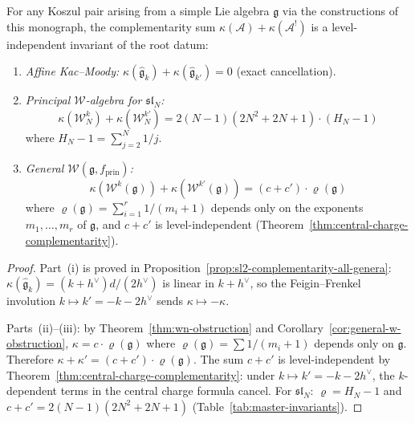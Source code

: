\begin{theorem}
\label{thm:complementarity-root-datum}
For any Koszul pair arising from a simple Lie algebra $\mathfrak{g}$ via the constructions of this monograph, the complementarity sum $\kappa(\mathcal{A}) + \kappa(\mathcal{A}^!)$ is a level-independent invariant of the root datum:
\begin{enumerate}[label=\textup{(\roman*)}]
\item \emph{Affine Kac--Moody:} $\kappa(\widehat{\mathfrak{g}}_k) + \kappa(\widehat{\mathfrak{g}}_{k'}) = 0$ \textup{(}exact cancellation\textup{)}.
\item \emph{Principal $\mathcal{W}$-algebra for $\mathfrak{sl}_N$:}
\begin{equation}\label{eq:wn-kappa-sum-general}
\kappa(\mathcal{W}_N^k) + \kappa(\mathcal{W}_N^{k'}) = 2(N{-}1)(2N^2{+}2N{+}1) \cdot (H_N - 1)
\end{equation}
where $H_N - 1 = \sum_{j=2}^N 1/j$.
\item \emph{General $\mathcal{W}(\mathfrak{g}, f_{\mathrm{prin}})$:}
\begin{equation}\label{eq:general-w-kappa-sum}
\kappa(\mathcal{W}^k(\mathfrak{g})) + \kappa(\mathcal{W}^{k'}(\mathfrak{g})) = (c + c') \cdot \varrho(\mathfrak{g})
\end{equation}
where $\varrho(\mathfrak{g}) = \sum_{i=1}^r 1/(m_i + 1)$ depends only on the exponents $m_1, \ldots, m_r$ of $\mathfrak{g}$, and $c + c'$ is level-independent \textup{(}Theorem~\textup{\ref{thm:central-charge-complementarity})}.
\end{enumerate}
\end{theorem}

\begin{proof}
Part~(i) is proved in Proposition~\ref{prop:sl2-complementarity-all-genera}: $\kappa(\widehat{\mathfrak{g}}_k) = (k+h^\vee) d / (2h^\vee)$ is linear in $k+h^\vee$, so the Feigin--Frenkel involution $k \mapsto k' = -k-2h^\vee$ sends $\kappa \mapsto -\kappa$.

Parts~(ii)--(iii): by Theorem~\ref{thm:wn-obstruction} and Corollary~\ref{cor:general-w-obstruction}, $\kappa = c \cdot \varrho(\mathfrak{g})$ where $\varrho(\mathfrak{g}) = \sum 1/(m_i+1)$ depends only on $\mathfrak{g}$. Therefore $\kappa + \kappa' = (c+c') \cdot \varrho(\mathfrak{g})$. The sum $c + c'$ is level-independent by Theorem~\ref{thm:central-charge-complementarity}: under $k \mapsto k' = -k-2h^\vee$, the $k$-dependent terms in the central charge formula cancel. For $\mathfrak{sl}_N$: $\varrho = H_N - 1$ and $c+c' = 2(N-1)(2N^2+2N+1)$ (Table~\ref{tab:master-invariants}).
\end{proof}

